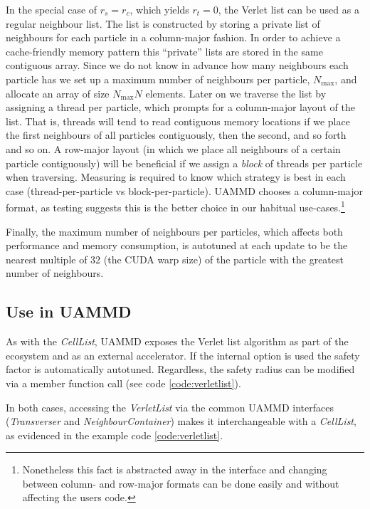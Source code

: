\documentclass[twoside,openright,titlepage,numbers=noenddot,%
headinclude,footinclude,cleardoublepage=empty,abstract=on,
BCOR=5mm,fontsize=11pt, dvipsnames, paper=b5
]{scrreprt}
\newcommand{\uammd}{\gls{UAMMD}\xspace}
\begin{document}
In the special case of $r_s=r_c$, which yields $r_t = 0$, the Verlet list can be used as a regular neighbour list.
The list is constructed by storing a private list of neighbours for each particle in a column-major fashion. In order to achieve a cache-friendly memory pattern this ``private'' lists are stored in the same contiguous array. Since we do not know in advance how many neighbours each particle has we set up a maximum number of neighbours per particle, $N_{\text{max}}$, and allocate an array of size $N_{\text{max}}N$ elements. Later on we traverse the list by assigning a thread per particle, which prompts for a column-major layout of the list. That is, threads will tend to read contiguous memory locations if we place the first neighbours of all particles contiguously, then the second, and so forth and so on. A row-major layout (in which we place all neighbours of a certain particle contiguously) will be beneficial if we assign a \emph{block} of threads per particle when traversing.
Measuring is required to know which strategy is best in each case (thread-per-particle vs block-per-particle). UAMMD chooses a column-major format, as testing suggests this is the better choice in our habitual use-cases.\footnote{Nonetheless this fact is abstracted away in the interface and changing between column- and row-major formats can be done easily and without affecting the users code.}

Finally, the maximum number of neighbours per particles, which affects both performance and memory consumption, is autotuned at each update to be the nearest multiple of 32 (the CUDA warp size) of the particle with the greatest number of neighbours.

\subsection*{Use in UAMMD}

As with the \emph{CellList}, \uammd exposes the Verlet list algorithm as part of the ecosystem and as an external accelerator. If the internal option is used the safety factor is automatically autotuned. Regardless, the safety radius can be modified via a member function call (see code \ref{code:verletlist}).

In both cases, accessing the \emph{VerletList} via the common \uammd interfaces (\emph{Transverser} and \emph{NeighbourContainer}) makes it interchangeable with a \emph{CellList}, as evidenced in the example code \ref{code:verletlist}.
\end{document}
